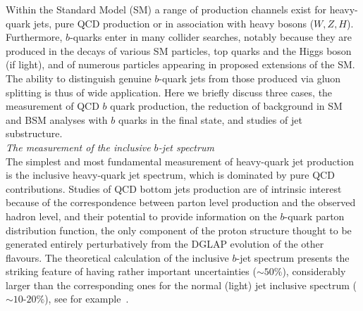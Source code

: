 Within the Standard Model (SM) a range of production channels exist for
heavy-quark jets, \eg pure QCD production or in association with heavy bosons
($W, Z, H$). Furthermore, $b$-quarks enter in many collider searches, notably
because they are produced in the decays of various SM particles, \eg top
quarks and the Higgs boson (if light), and of numerous particles appearing
in proposed extensions of the SM. The ability to distinguish genuine $b$-quark jets from those produced via gluon splitting is thus of wide application. Here we briefly discuss three cases, the measurement of QCD $b$ quark production, the reduction of background in SM and BSM analyses with $b$ quarks in the final state, and studies of jet substructure.%
%
\\[5mm]
{\em The measurement of the inclusive $b$-jet spectrum}
\\[5mm]
The simplest and most fundamental measurement of heavy-quark jet production is
the inclusive heavy-quark jet spectrum, which is dominated by pure QCD
contributions.  Studies of QCD bottom jets production are of intrinsic interest
because of the correspondence between parton level production and the observed
hadron level, and their potential to provide information on the $b$-quark
parton distribution function, the only component of the proton structure
thought to be generated entirely perturbatively from the DGLAP evolution of the
other flavours.  The theoretical calculation of the inclusive
$b$-jet spectrum presents the striking feature of having rather important uncertainties ($\sim 50\%$), considerably larger than the
corresponding ones for the normal (light) jet inclusive spectrum ($\sim
10$-$20\%$), see for example~\cite{Frixione:1996nh}.  

